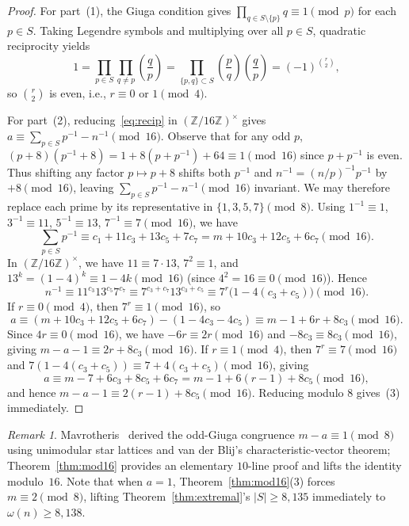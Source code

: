 \documentclass[11pt]{article}
\theoremstyle{remark}
\newtheorem{remark}[theorem]{Remark}
\begin{document}
\begin{proof}
For part~(1), the Giuga condition gives $\prod_{q\in S\setminus\{p\}} q \equiv 1 \pmod p$
for each $p \in S$. Taking Legendre symbols and multiplying over all $p \in S$,
quadratic reciprocity yields
\[
  1 = \prod_{p\in S} \prod_{q\neq p}\left(\frac{q}{p}\right)
    = \prod_{\{p,q\}\subset S}\left(\frac{p}{q}\right)\left(\frac{q}{p}\right)
    = (-1)^{\binom{r}{2}},
\]
so $\binom{r}{2}$ is even, i.e., $r \equiv 0$ or $1 \pmod 4$.

For part~(2), reducing~\eqref{eq:recip} in $(\mathbb{Z}/16\mathbb{Z})^\times$
gives $a \equiv \sum_{p\in S} p^{-1} - n^{-1} \pmod{16}$. Observe that for any
odd $p$, $(p + 8)(p^{-1} + 8) = 1 + 8(p + p^{-1}) + 64 \equiv 1 \pmod{16}$ since
$p + p^{-1}$ is even. Thus shifting any factor $p \mapsto p + 8$ shifts both
$p^{-1}$ and $n^{-1} = (n/p)^{-1}p^{-1}$ by $+8 \pmod{16}$, leaving
$\sum_{p\in S} p^{-1} - n^{-1} \pmod{16}$ invariant. We may therefore replace
each prime by its representative in $\{1,3,5,7\} \pmod 8$. Using
$1^{-1}\equiv 1$, $3^{-1}\equiv 11$, $5^{-1}\equiv 13$, $7^{-1}\equiv 7 \pmod{16}$,
we have
\[
  \sum_{p\in S} p^{-1} \equiv c_1 + 11c_3 + 13c_5 + 7c_7
  = m + 10c_3 + 12c_5 + 6c_7 \pmod{16}.
\]
In $(\mathbb{Z}/16\mathbb{Z})^\times$, we have $11 \equiv 7\cdot 13$, $7^2\equiv 1$,
and $13^k = (1 - 4)^k \equiv 1 - 4k \pmod{16}$ (since $4^2 = 16 \equiv 0 \pmod{16}$).
Hence
\[
  n^{-1} \equiv 11^{c_3} 13^{c_5} 7^{c_7}
  \equiv 7^{c_3 + c_7} 13^{c_3 + c_5}
  \equiv 7^r\bigl(1 - 4(c_3 + c_5)\bigr) \pmod{16}.
\]
If $r \equiv 0 \pmod 4$, then $7^r \equiv 1 \pmod{16}$, so
\[
  a \equiv (m + 10c_3 + 12c_5 + 6c_7) - (1 - 4c_3 - 4c_5)
    \equiv m - 1 + 6r + 8c_3 \pmod{16}.
\]
Since $4r \equiv 0 \pmod{16}$, we have $-6r \equiv 2r \pmod{16}$ and
$-8c_3 \equiv 8c_3 \pmod{16}$, giving $m - a - 1 \equiv 2r + 8c_3 \pmod{16}$.
If $r \equiv 1 \pmod 4$, then $7^r \equiv 7 \pmod{16}$ and
$7(1 - 4(c_3+c_5)) \equiv 7 + 4(c_3+c_5) \pmod{16}$, giving
\[
  a \equiv m - 7 + 6c_3 + 8c_5 + 6c_7 = m - 1 + 6(r - 1) + 8c_5 \pmod{16},
\]
and hence $m - a - 1 \equiv 2(r - 1) + 8c_5 \pmod{16}$. Reducing modulo $8$
gives~(3) immediately.
\end{proof}

\begin{remark}
Mavrotheris~\cite{Mavrotheris2026} derived the odd-Giuga congruence
$m - a \equiv 1 \pmod 8$ using unimodular star lattices and van der Blij's
characteristic-vector theorem; Theorem~\ref{thm:mod16} provides an elementary
$10$-line proof and lifts the identity modulo~$16$. Note that when $a = 1$,
Theorem~\ref{thm:mod16}(3) forces $m \equiv 2 \pmod 8$, lifting
Theorem~\ref{thm:extremal}'s $|S| \ge 8{,}135$ immediately to
$\omega(n) \ge 8{,}138$.
\end{remark}
\end{document}
